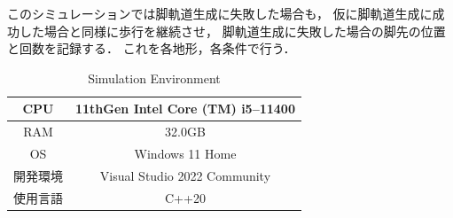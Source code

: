 このシミュレーションでは脚軌道生成に失敗した場合も，
仮に脚軌道生成に成功した場合と同様に歩行を継続させ，
脚軌道生成に失敗した場合の脚先の位置と回数を記録する．
これを各地形，各条件で行う．
\\

\begin{table}[htbp]
	\caption{Simulation Environment}
	\label{tab:simulation_env}  %
	\begin{center}
   	\begin{tabular}{|c||c|} \hline  %
      CPU & 11thGen Intel Core (TM) i5--11400  \\ \hline  %
      RAM & 32.0GB  \\ \hline  %
      OS & Windows 11 Home  \\ \hline  %
      開発環境 & Visual Studio 2022 Community  \\ \hline  %
      使用言語 & C++20  \\ \hline  %
    \end{tabular}
  \end{center}
\end{table}

\newpage

